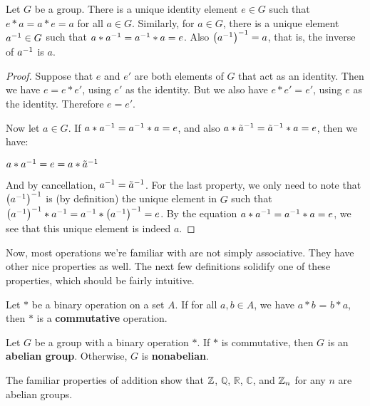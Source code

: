 \begin{theorem}
Let $G$ be a group. There is a unique identity element $e \in G$ such that $e*a = a*e = a$ for all $a \in G$. Similarly, for $a \in G$, there is a unique element $\inv{a} \in G$ such that $a*\inv{a} = \inv{a}*a = e$. Also $\left(\inv{a}\right)^{-1} = a$, that is, the inverse of $\inv a$ is $a$.
\end{theorem}

\begin{proof}
Suppose that $e$ and $e'$ are both elements of $G$ that act as an identity. Then we have $e = e*e'$, using $e'$ as the identity. But we also have $e*e' = e'$, using $e$ as the identity. Therefore $e = e'$.

Now let $a \in G$. If $a*\inv{a} = \inv{a}*a = e$, and also $a*\inv{\tilde{a}} = \inv{\tilde{a}}*a = e$, then we have:

\begin{center}
    $a*\inv{a} = e = a*{\inv{\tilde{a}}}$
\end{center}

And by cancellation, $\inv{a} = \inv{\tilde{a}}$. For the last property, we only need to note that $\left(\inv{a}\right)^{-1}$ is (by definition) the unique element in $G$ such that $\left(\inv{a}\right)^{-1} * \inv{a} = \inv{a} * \left(\inv{a}\right)^{-1} = e$. By the equation $a * \inv{a} = \inv{a} * a = e$, we see that this unique element is indeed $a$.

\end{proof}

Now, most operations we're familiar with are not simply associative. They have other nice properties as well. The next few definitions solidify one of these properties, which should be fairly intuitive.

\begin{definition}
Let $*$ be a binary operation on a set $A$. \extra If for all $a, b \in A$, we have $a * b$ = $b * a$, then $*$ is a \textbf{commutative} operation.
\end{definition}

\begin{definition}
Let $G$ be a group with a binary operation $*$. \extra If $*$ is commutative, then $G$ is an \textbf{abelian group}. Otherwise, $G$ is \textbf{nonabelian}.
\end{definition}

\begin{example}
The familiar properties of addition show that $\z$, $\mathbb{Q}$, $\mathbb{R}$, $\mathbb{C}$, and $\zn[n]$ for any $n$ are abelian groups.
\end{example}

